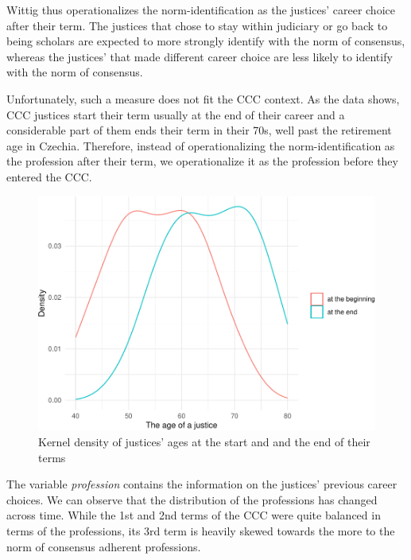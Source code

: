 \documentclass[
  11pt,
]{article}
\begin{document}
Wittig thus operationalizes the norm-identification as the justices'
career choice after their term. The justices that chose to stay within
judiciary or go back to being scholars are expected to more strongly
identify with the norm of consensus, whereas the justices' that made
different career choice are less likely to identify with the norm of
consensus.

Unfortunately, such a measure does not fit the CCC context. As the data
shows, CCC justices start their term usually at the end of their career
and a considerable part of them ends their term in their 70s, well past
the retirement age in Czechia. Therefore, instead of operationalizing
the norm-identification as the profession after their term, we
operationalize it as the profession before they entered the CCC.

\begin{figure}
\centering
\includegraphics{separate_opinions_files/figure-latex/unnamed-chunk-2-1.pdf}
\caption{Kernel density of justices' ages at the start and and the end
of their terms}
\end{figure}

The variable \emph{profession} contains the information on the justices'
previous career choices. We can observe that the distribution of the
professions has changed across time. While the 1st and 2nd terms of the
CCC were quite balanced in terms of the professions, its 3rd term is
heavily skewed towards the more to the norm of consensus adherent
professions.
\end{document}
